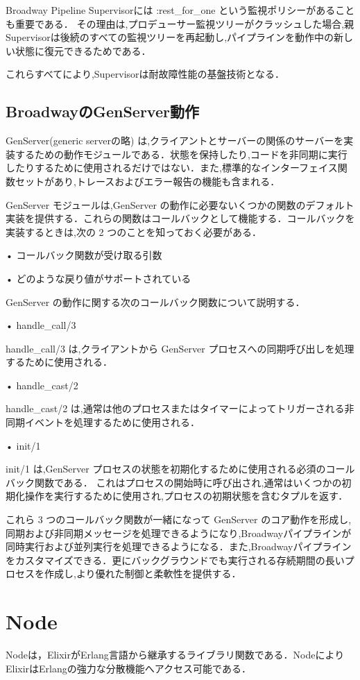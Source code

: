 \documentclass[a4paper]{jreport}	%
\begin{document}
Broadway Pipeline Supervisorには :rest\_for\_one という監視ポリシーがあることも重要である． その理由は,プロデューサー監視ツリーがクラッシュした場合,親Supervisorは後続のすべての監視ツリーを再起動し,パイプラインを動作中の新しい状態に復元できるためである．


これらすべてにより,Supervisorは耐故障性能の基盤技術となる．

\subsection{BroadwayのGenServer動作}
GenServer(generic serverの略) は,クライアントとサーバーの関係のサーバーを実装するための動作モジュールである．状態を保持したり,コードを非同期に実行したりするために使用されるだけではない．また,標準的なインターフェイス関数セットがあり,トレースおよびエラー報告の機能も含まれる\cite{M}．

GenServer モジュールは,GenServer の動作に必要ないくつかの関数のデフォルト実装を提供する．これらの関数はコールバックとして機能する．コールバックを実装するときは,次の 2 つのことを知っておく必要がある．

• コールバック関数が受け取る引数

• どのような戻り値がサポートされている

GenServer の動作に関する次のコールバック関数について説明する．

• handle\_call/3

handle\_call/3 は,クライアントから GenServer プロセスへの同期呼び出しを処理するために使用される．

• handle\_cast/2

handle\_cast/2 は,通常は他のプロセスまたはタイマーによってトリガーされる非同期イベントを処理するために使用される．

• init/1

init/1 は,GenServer プロセスの状態を初期化するために使用される必須のコールバック関数である． これはプロセスの開始時に呼び出され,通常はいくつかの初期化操作を実行するために使用され,プロセスの初期状態を含むタプルを返す．


これら 3 つのコールバック関数が一緒になって GenServer のコア動作を形成し,同期および非同期メッセージを処理できるようになり,Broadwayパイプラインが同時実行および並列実行を処理できるようになる．また,Broadwayパイプラインをカスタマイズできる．更にバックグラウンドでも実行される存続期間の長いプロセスを作成し,より優れた制御と柔軟性を提供する．


\section{Node}
Nodeは，ElixirがErlang言語から継承するライブラリ関数である\cite{H}．NodeによりElixirはErlangの強力な分散機能へアクセス可能である\cite{J}．
\end{document}
